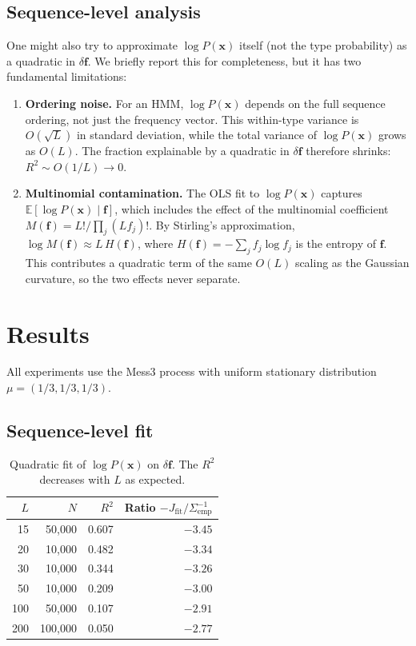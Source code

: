 \documentclass[11pt]{article}
\newcommand{\vf}{\mathbf{f}}
\newcommand{\vx}{\mathbf{x}}
\begin{document}
\subsection{Sequence-level analysis}

One might also try to approximate $\log P(\vx)$ itself (not the type probability) as a quadratic in $\delta\vf$. We briefly report this for completeness, but it has two fundamental limitations:
\begin{enumerate}
  \item \textbf{Ordering noise.} For an HMM, $\log P(\vx)$ depends on the full sequence ordering, not just the frequency vector. This within-type variance is $O(\sqrt{L})$ in standard deviation, while the total variance of $\log P(\vx)$ grows as $O(L)$. The fraction explainable by a quadratic in $\delta\vf$ therefore shrinks: $R^2 \sim O(1/L) \to 0$.
  \item \textbf{Multinomial contamination.} The OLS fit to $\log P(\vx)$ captures $\mathbb{E}[\log P(\vx) \mid \vf]$, which includes the effect of the multinomial coefficient $M(\vf) = L!/\prod_j (Lf_j)!$. By Stirling's approximation, $\log M(\vf) \approx L\,H(\vf)$, where $H(\vf) = -\sum_j f_j \log f_j$ is the entropy of $\vf$. This contributes a quadratic term of the same $O(L)$ scaling as the Gaussian curvature, so the two effects never separate.
\end{enumerate}

\section{Results}

All experiments use the Mess3 process with uniform stationary distribution $\mu = (1/3, 1/3, 1/3)$.

\subsection{Sequence-level fit}

\begin{table}[h]
\centering
\caption{Quadratic fit of $\log P(\vx)$ on $\delta\vf$. The $R^2$ decreases with $L$ as expected.}
\label{tab:seq-level}
\begin{tabular}{rrrr}
\toprule
$L$ & $N$ & $R^2$ & Ratio $-J_{\mathrm{fit}} / \Sigma_{\mathrm{emp}}^{-1}$ \\
\midrule
15  & 50{,}000  & 0.607 & $-3.45$ \\
20  & 10{,}000  & 0.482 & $-3.34$ \\
30  & 10{,}000  & 0.344 & $-3.26$ \\
50  & 10{,}000  & 0.209 & $-3.00$ \\
100 & 50{,}000  & 0.107 & $-2.91$ \\
200 & 100{,}000 & 0.050 & $-2.77$ \\
\bottomrule
\end{tabular}
\end{table}
\end{document}
